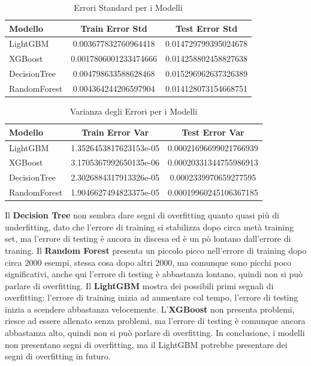 \begin{table}[H]
    \centering
    \begin{tabular}{lcc}
    \toprule
    \textbf{Modello} & \textbf{Train Error Std} & \textbf{Test Error Std} \\
    \midrule
    LightGBM & 0.003677832760964418 & 0.014729799395024678 \\
    XGBoost & 0.0017806001233474666 & 0.014258802458827638 \\
    DecisionTree & 0.004798633588628468 & 0.015296962637326389 \\
    RandomForest & 0.004364244206597904 & 0.014128073154668751 \\
    \bottomrule
    \end{tabular}
    \caption{Errori Standard per i Modelli}
    
\end{table}

\begin{table}[H]
    \centering
    \begin{tabular}{lcc}
    \toprule
    \textbf{Modello} & \textbf{Train Error Var} & \textbf{Test Error Var} \\
    \midrule
    LightGBM & 1.3526453817623153e-05 & 0.00021696699021766939 \\
    XGBoost & 3.1705367992650135e-06 & 0.00020331344755986913 \\
    DecisionTree & 2.3026884317913326e-05 & 0.0002339970659277595 \\
    RandomForest & 1.9046627494823375e-05 & 0.00019960245106367185 \\
    \bottomrule
    \end{tabular}
    \caption{Varianza degli Errori per i Modelli}
    
\end{table}

\noindent Il \textbf{Decision Tree} non sembra dare segni di overfitting quanto quasi più di underfitting, dato che l'errore di training si stabilizza dopo circa metà training set, ma l'errore di testing è ancora in discesa ed è un pò lontano dall'errore di traning. Il \textbf{Random Forest} presenta un piccolo picco nell'errore di training dopo circa 2000 esempi, stessa cosa dopo altri 2000, ma comunque sono picchi poco significativi, anche qui l'errore di testing è abbastanza lontano, quindi non si può parlare di overfitting. Il \textbf{LightGBM} mostra dei possibili primi segnali di overfitting: l'errore di training inizia ad aumentare col tempo, l'errore di testing inizia a scendere abbastanza velocemente. L'\textbf{XGBoost} non presenta problemi, riesce ad essere allenato senza problemi, ma l'errore di testing è comunque ancora abbastanza alto, quindi non si può parlare di overfitting. In conclusione, i modelli non presentano segni di overfitting, ma il LightGBM potrebbe presentare dei segni di overfitting in futuro.

